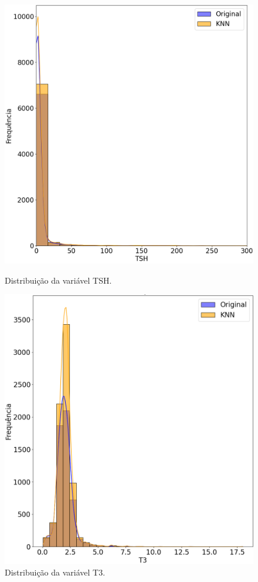 \documentclass[11pt]{article}
\begin{document}
\begin{figure}[H]
    \centering
    \begin{minipage}{0.48\textwidth}
        \centering
        \includegraphics[width=\textwidth]{img/TSH_distrib.png}
        \caption{Distribuição da variável TSH.}
        \label{fig:TSH_distrib}
    \end{minipage}
    \hfill
    \begin{minipage}{0.48\textwidth}
        \centering
        \includegraphics[width=\textwidth]{img/T3_distrib.png}
        \caption{Distribuição da variável T3.}
        \label{fig:T3_distrib}
    \end{minipage}
\end{figure}
\end{document}
